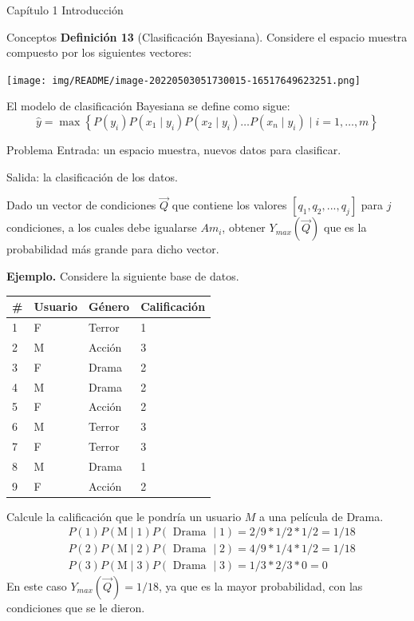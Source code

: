 \documentclass[
  spanish,
  ignorenonframetext,
]{beamer}
\begin{document}
\begin{frame}[allowframebreaks]{Capítulo 1 Introducción}
\begin{block}{Conceptos}
\textbf{Definición 13} (Clasificación Bayesiana). Considere el espacio
muestra compuesto por los siguientes vectores:

\texttt{[image: img/README/image-20220503051730015-16517649623251.png]}

El modelo de clasificación Bayesiana se define como sigue: \[
\hat{y}=\max \left\{P\left(y_{i}\right) P\left(x_{1} \mid y_{i}\right) P\left(x_{2} \mid y_{i}\right) \ldots P\left(x_{n} \mid y_{i}\right) \mid i=1, \ldots, m\right\}
\]
\end{block}

\begin{block}{Problema}
\protect\hypertarget{problema}{}
Entrada: un espacio muestra, nuevos datos para clasificar.

Salida: la clasificación de los datos.

Dado un vector de condiciones \(\vec{Q}\) que contiene los valores
\([q_1,q_2,...,q_j]\) para \(j\) condiciones, a los cuales debe
igualarse \(Am_i\), obtener \(Y_{max}(\vec{Q})\) que es la probabilidad
más grande para dicho vector.

\textbf{Ejemplo.} Considere la siguiente base de datos.

\begin{longtable}[]{@{}llll@{}}
\toprule
\# & Usuario & Género & Calificación\tabularnewline
\midrule
\endhead
1 & F & Terror & 1\tabularnewline
2 & M & Acción & 3\tabularnewline
3 & F & Drama & 2\tabularnewline
4 & M & Drama & 2\tabularnewline
5 & F & Acción & 2\tabularnewline
6 & M & Terror & 3\tabularnewline
7 & F & Terror & 3\tabularnewline
8 & M & Drama & 1\tabularnewline
9 & F & Acción & 2\tabularnewline
\bottomrule
\end{longtable}

Calcule la calificación que le pondría un usuario \(M\) a una película
de Drama. \[
\begin{aligned}
&P(1) P(\mathrm{M} \mid 1) P(\text { Drama } \mid 1)=2 / 9 * 1 / 2 * 1 / 2=1 / 18 \\
&P(2) P(\mathrm{M} \mid 2) P(\text { Drama } \mid 2)=4 / 9 * 1 / 4 * 1 / 2=1 / 18 \\
&P(3) P(\mathrm{M} \mid 3) P(\text { Drama } \mid 3)=1 / 3 * 2 / 3 * 0=0
\end{aligned}
\] En este caso \(Y_{max}(\vec{Q})=1/18\), ya que es la mayor
probabilidad, con las condiciones que se le dieron.
\end{block}
\end{frame}
\end{document}
